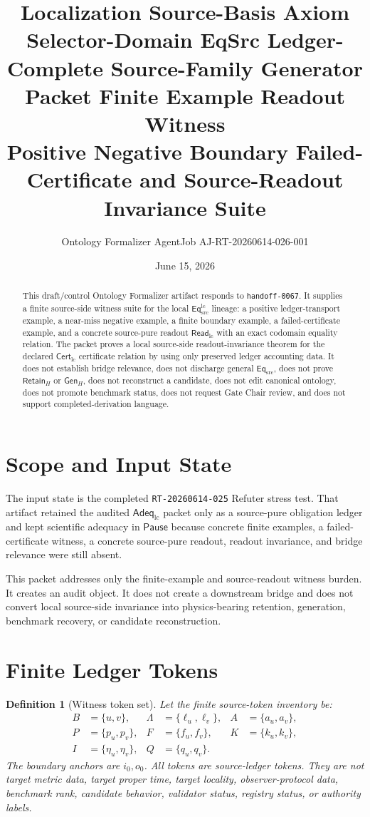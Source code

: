 \documentclass[11pt]{article}
\title{\textbf{Localization Source-Basis Axiom Selector-Domain EqSrc Ledger-Complete Source-Family Generator Packet Finite Example Readout Witness}\\[0.35em]
\large Positive Negative Boundary Failed-Certificate and Source-Readout Invariance Suite}
\author{Ontology Formalizer AgentJob AJ-RT-20260614-026-001}
\date{June 15, 2026}
\newcommand{\EqSrc}{\mathsf{Eq}_{\mathrm{src}}}
\newcommand{\EqLC}{\mathsf{Eq}_{\mathrm{src}}^{\mathrm{lc}}}
\newcommand{\CertLC}{\mathsf{Cert}_{\mathrm{lc}}}
\newcommand{\ReadLC}{\mathsf{Read}_{\mathrm{lc}}}
\newcommand{\AdeqLC}{\mathsf{Adeq}_{\mathrm{lc}}}
\newcommand{\RetainH}{\mathsf{Retain}_{H}}
\newcommand{\GenH}{\mathsf{Gen}_{H}}
\newcommand{\Pause}{\mathsf{Pause}}
\newtheorem{definition}{Definition}
\begin{document}
\maketitle

\begin{abstract}
This draft/control Ontology Formalizer artifact responds to
\texttt{handoff-0067}. It supplies a finite source-side witness suite
for the local \(\EqLC\) lineage: a positive ledger-transport example, a
near-miss negative example, a finite boundary example, a
failed-certificate example, and a concrete source-pure readout
\(\ReadLC\) with an exact codomain equality relation. The packet proves
a local source-side readout-invariance theorem for the declared
\(\CertLC\) certificate relation by using only preserved ledger
accounting data. It does not establish bridge relevance, does not
discharge general \(\EqSrc\), does not prove \(\RetainH\) or
\(\GenH\), does not reconstruct a candidate, does not edit canonical
ontology, does not promote benchmark status, does not request Gate
Chair review, and does not support completed-derivation language.
\end{abstract}

\section{Scope and Input State}

The input state is the completed \texttt{RT-20260614-025} Refuter stress
test. That artifact retained the audited \(\AdeqLC\) packet only as a
source-pure obligation ledger and kept scientific adequacy in
\(\Pause\) because concrete finite examples, a failed-certificate
witness, a concrete source-pure readout, readout invariance, and bridge
relevance were still absent.

This packet addresses only the finite-example and source-readout
witness burden. It creates an audit object. It does not create a
downstream bridge and does not convert local source-side invariance into
physics-bearing retention, generation, benchmark recovery, or candidate
reconstruction.

\section{Finite Ledger Tokens}

\begin{definition}[Witness token set]
Let the finite source-token inventory be:
\[
\begin{aligned}
    B &= \{u,v\},&
    \Lambda &= \{\ell_u,\ell_v\},&
    A &= \{a_u,a_v\},\\
    P &= \{p_u,p_v\},&
    F &= \{f_u,f_v\},&
    K &= \{k_u,k_v\},\\
    I &= \{\eta_u,\eta_v\},&
    Q &= \{q_u,q_v\}.&
\end{aligned}
\]
The boundary anchors are \(i_0,o_0\). All tokens are source-ledger
tokens. They are not target metric data, target proper time, target
locality, observer-protocol data, benchmark rank, candidate behavior,
validator status, registry status, or authority labels.
\end{definition}
\end{document}
